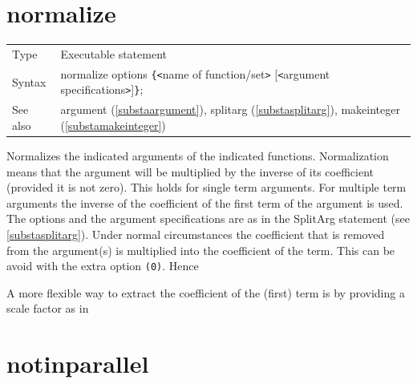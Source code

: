 
\section{normalize}
\label{substanormalize}

\noindent \begin{tabular}{ll}
Type & Executable statement\\
Syntax & normalize options \verb:{:{\tt<}name of function/set{\tt>}
         [{\tt<}argument specifications{\tt>}]\verb:}:;
\\ See also & argument (\ref{substaargument}), splitarg 
            (\ref{substasplitarg}), makeinteger (\ref{substamakeinteger})
\end{tabular} \vspace{4mm}

\noindent Normalizes the indicated 
arguments of the indicated functions. Normalization means 
that the argument will be multiplied by the inverse of its 
coefficient 
(provided it is not zero). This holds for single term arguments. For 
multiple term arguments the inverse of the coefficient of the first term of 
the argument is used. The options and the argument specifications are as in 
the SplitArg statement (see \ref{substasplitarg}). Under normal 
circumstances the coefficient that is removed from the argument(s) is 
multiplied into the coefficient of the term. This can be avoid with the 
extra option
\verb:(0):. Hence



A more flexible way to extract the coefficient of the (first) term is by 
providing a scale factor as in

\vspace{10mm}


\section{notinparallel}
\label{substanotinparallel}

